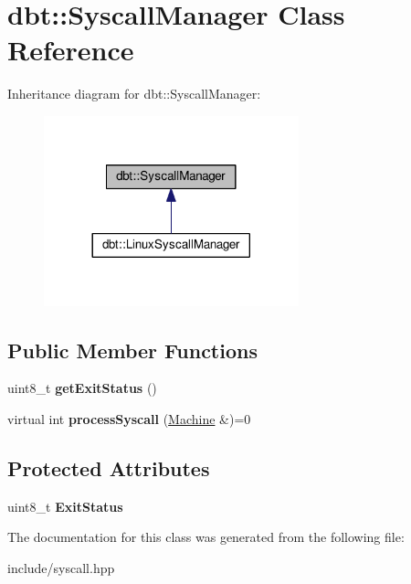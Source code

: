 \hypertarget{classdbt_1_1_syscall_manager}{}\section{dbt\+:\+:Syscall\+Manager Class Reference}
\label{classdbt_1_1_syscall_manager}


Inheritance diagram for dbt\+:\+:Syscall\+Manager\+:\nopagebreak
\begin{figure}[H]
\begin{center}
\leavevmode
\includegraphics[width=209pt]{classdbt_1_1_syscall_manager__inherit__graph}
\end{center}
\end{figure}
\subsection*{Public Member Functions}
\begin{DoxyCompactItemize}
\item 
uint8\+\_\+t {\bfseries get\+Exit\+Status} ()\hypertarget{classdbt_1_1_syscall_manager_a654398921269b2213c259f9c1de956fd}{}\label{classdbt_1_1_syscall_manager_a654398921269b2213c259f9c1de956fd}

\item 
virtual int {\bfseries process\+Syscall} (\hyperlink{classdbt_1_1_machine}{Machine} \&)=0\hypertarget{classdbt_1_1_syscall_manager_a0f0203b7f822a03b05be2021c742298a}{}\label{classdbt_1_1_syscall_manager_a0f0203b7f822a03b05be2021c742298a}

\end{DoxyCompactItemize}
\subsection*{Protected Attributes}
\begin{DoxyCompactItemize}
\item 
uint8\+\_\+t {\bfseries Exit\+Status}\hypertarget{classdbt_1_1_syscall_manager_abeae8718319f6c79d6d7f764b8a2abfb}{}\label{classdbt_1_1_syscall_manager_abeae8718319f6c79d6d7f764b8a2abfb}

\end{DoxyCompactItemize}


The documentation for this class was generated from the following file\+:\begin{DoxyCompactItemize}
\item 
include/syscall.\+hpp\end{DoxyCompactItemize}
